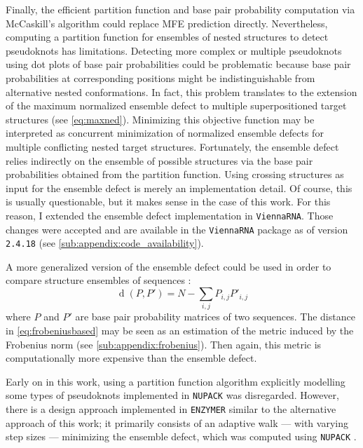 \documentclass[../../master.tex]{subfiles}
\begin{document}
Finally, the efficient partition function and base pair probability computation via McCaskill's algorithm could replace MFE prediction directly.
Nevertheless, computing a partition function for ensembles of nested structures to detect pseudoknots has limitations.
Detecting more complex or multiple pseudoknots using dot plots of base pair probabilities could be problematic because base pair probabilities at corresponding positions might be indistinguishable from alternative nested conformations.
In fact, this problem translates to the extension of the maximum normalized ensemble defect to multiple superpositioned target structures (see \autoref{eq:maxned}).
Minimizing this objective function may be interpreted as concurrent minimization of normalized ensemble defects for multiple conflicting nested target structures.
Fortunately, the ensemble defect relies indirectly on the ensemble of possible structures via the base pair probabilities obtained from the partition function.
Using crossing structures as input for the ensemble defect is merely an implementation detail.
Of course, this is usually questionable, but it makes sense in the case of this work.
For this reason, I extended the ensemble defect implementation in \texttt{ViennaRNA}. Those changes were accepted and are available in the \texttt{ViennaRNA} package as of version \texttt{2.4.18} (see \autoref{sub:appendix:code_availability}).

A more generalized version of the ensemble defect could be used in order to compare structure ensembles of sequences \parencite{dirks_paradigms_2004}:
\begin{equation}\label{eq:frobeniusbased}
	\operatorname{d}(P,P') = N - \sum_{i,j} P_{i,j} P'_{i,j}
\end{equation}
where $P$ and $P'$ are base pair probability matrices of two sequences.
The distance in \autoref{eq:frobeniusbased} may be seen as an estimation of the metric induced by the Frobenius norm (see \autoref{sub:appendix:frobenius}).
Then again, this metric is computationally more expensive than the ensemble defect.

Early on in this work, using a partition function algorithm explicitly modelling some types of pseudoknots implemented in \texttt{NUPACK} was disregarded.
However, there is a design approach implemented in \texttt{ENZYMER} similar to the alternative approach of this work; it primarily consists of an adaptive walk --- with varying step sizes --- minimizing the ensemble defect, which was computed using \texttt{NUPACK} \parencite{zandi_adaptive_2016}.

\end{document}
